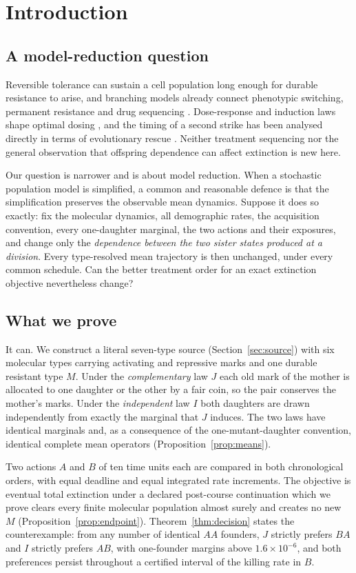 \documentclass[11pt]{article}
\theoremstyle{remark}
\begin{document}
\section{Introduction}\label{sec:intro}

\subsection{A model-reduction question}
Reversible tolerance can sustain a cell population long enough for durable
resistance to arise, and branching models already connect phenotypic switching,
permanent resistance and drug sequencing \cite{gunnarsson2020,iwasa2006}.
Dose-response and induction laws shape optimal dosing \cite{gunnarsson2025}, and
the timing of a second strike has been analysed directly in terms of
evolutionary rescue \cite{patil2026,orr2014}. Neither treatment sequencing nor
the general observation that offspring dependence can affect extinction is new
here.

Our question is narrower and is about model reduction. When a stochastic
population model is simplified, a common and reasonable defence is that the
simplification preserves the observable mean dynamics. Suppose it does so
exactly: fix the molecular dynamics, all demographic rates, the acquisition
convention, every one-daughter marginal, the two actions and their exposures,
and change only the \emph{dependence between the two sister states produced at a
division}. Every type-resolved mean trajectory is then unchanged, under every
common schedule. Can the better treatment order for an exact extinction
objective nevertheless change?

\subsection{What we prove}
It can. We construct a literal seven-type source (Section~\ref{sec:source}) with
six molecular types carrying activating and repressive marks and one durable
resistant type $M$. Under the \emph{complementary} law $J$ each old mark of the
mother is allocated to one daughter or the other by a fair coin, so the pair
conserves the mother's marks. Under the \emph{independent} law $I$ both daughters
are drawn independently from exactly the marginal that $J$ induces. The two laws
have identical marginals and, as a consequence of the one-mutant-daughter
convention, identical complete mean operators (Proposition~\ref{prop:means}).

Two actions $A$ and $B$ of ten time units each are compared in both chronological
orders, with equal deadline and equal integrated rate increments. The objective
is eventual total extinction under a declared post-course continuation which we
prove clears every finite molecular population almost surely and creates no new
$M$ (Proposition~\ref{prop:endpoint}). Theorem~\ref{thm:decision} states the
counterexample: from any number of identical $AA$ founders, $J$ strictly prefers
$BA$ and $I$ strictly prefers $AB$, with one-founder margins above
$1.6\times10^{-6}$, and both preferences persist throughout a certified interval
of the killing rate in $B$.
\end{document}
